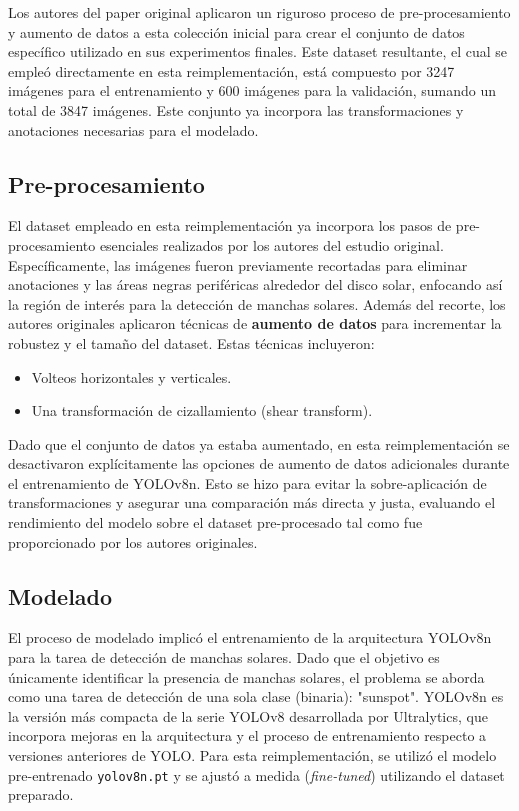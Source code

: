 \documentclass[journal]{IEEEtran}
\begin{document}
Los autores del paper original aplicaron un riguroso proceso de pre-procesamiento y aumento de datos a esta colección inicial para crear el conjunto de datos específico utilizado en sus experimentos finales. Este dataset resultante, el cual se empleó directamente en esta reimplementación, está compuesto por 3247 imágenes para el entrenamiento y 600 imágenes para la validación, sumando un total de 3847 imágenes. Este conjunto ya incorpora las transformaciones y anotaciones necesarias para el modelado.

\subsection{Pre-procesamiento}


El dataset empleado en esta reimplementación ya incorpora los pasos de pre-procesamiento esenciales realizados por los autores del estudio original. Específicamente, las imágenes fueron previamente recortadas para eliminar anotaciones y las áreas negras periféricas alrededor del disco solar, enfocando así la región de interés para la detección de manchas solares. Además del recorte, los autores originales aplicaron técnicas de \textbf{aumento de datos} para incrementar la robustez y el tamaño del dataset. Estas técnicas incluyeron:
\begin{itemize}
    \item Volteos horizontales y verticales.
    \item Una transformación de cizallamiento (shear transform).
\end{itemize}

Dado que el conjunto de datos ya estaba aumentado, en esta reimplementación se desactivaron explícitamente las opciones de aumento de datos adicionales durante el entrenamiento de YOLOv8n. Esto se hizo para evitar la sobre-aplicación de transformaciones y asegurar una comparación más directa y justa, evaluando el rendimiento del modelo sobre el dataset pre-procesado tal como fue proporcionado por los autores originales.

\subsection{Modelado}
El proceso de modelado implicó el entrenamiento de la arquitectura YOLOv8n para la tarea de detección de manchas solares. Dado que el objetivo es únicamente identificar la presencia de manchas solares, el problema se aborda como una tarea de detección de una sola clase (binaria): "sunspot". YOLOv8n es la versión más compacta de la serie YOLOv8 desarrollada por Ultralytics, que incorpora mejoras en la arquitectura y el proceso de entrenamiento respecto a versiones anteriores de YOLO. Para esta reimplementación, se utilizó el modelo pre-entrenado \texttt{yolov8n.pt} y se ajustó a medida (\textit{fine-tuned}) utilizando el dataset preparado.
\end{document}
